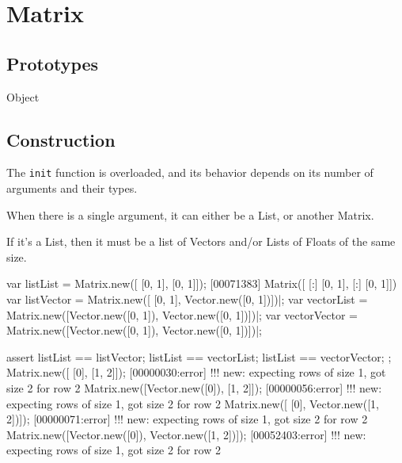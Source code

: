 
\section{Matrix}

\subsection{Prototypes}
\begin{refObjects}
\item[Object]
\end{refObjects}

\subsection{Construction}
\label{sec:specs:matrix:ctor}

The \lstinline|init| function is overloaded, and its behavior depends on its
number of arguments and their types.

When there is a single argument, it can either be a List, or another Matrix.

If it's a List, then it must be a list of Vectors and/or Lists of Floats of
the same size.

\begin{urbiscript}
var listList     = Matrix.new([           [0, 1],             [0, 1]]);
[00071383] Matrix([
[:]  [0, 1],
[:]  [0, 1]])
var listVector   = Matrix.new([           [0, 1],  Vector.new([0, 1])])|;
var vectorList   = Matrix.new([Vector.new([0, 1]), Vector.new([0, 1])])|;
var vectorVector = Matrix.new([Vector.new([0, 1]), Vector.new([0, 1])])|;

assert
{
  listList == listVector;
  listList == vectorList;
  listList == vectorVector;
};
Matrix.new([           [0],            [1, 2]]);
[00000030:error] !!! new: expecting rows of size 1, got size 2 for row 2
Matrix.new([Vector.new([0]),           [1, 2]]);
[00000056:error] !!! new: expecting rows of size 1, got size 2 for row 2
Matrix.new([           [0], Vector.new([1, 2])]);
[00000071:error] !!! new: expecting rows of size 1, got size 2 for row 2
Matrix.new([Vector.new([0]), Vector.new([1, 2])]);
[00052403:error] !!! new: expecting rows of size 1, got size 2 for row 2
\end{urbiscript}

